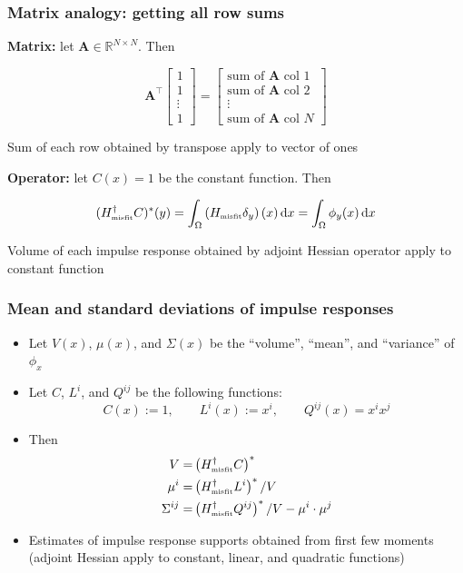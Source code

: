 \documentclass[10pt,final,xcolor=dvipsnames,aspect ratio=169]{beamer}
\begin{document}
\begin{frame}
	\frametitle{Matrix analogy: getting all row sums}
	
	\textbf{Matrix:} let $\mathbf{A} \in \mathbb{R}^{N \times N}$. Then
	
	$$\mathbf{A}^{\top} \begin{bmatrix}
	1 \\ 1 \\ \vdots \\ 1
	\end{bmatrix} = \begin{bmatrix}
	\text{sum of }\mathbf{A} \text{ col }1 \\
	\text{sum of }\mathbf{A} \text{ col }2 \\
	\vdots \\
	\text{sum of }\mathbf{A} \text{ col }N
	\end{bmatrix}$$
	
	Sum of each row obtained by transpose apply to vector of ones
	
	\vspace{3em}
	
	\textbf{Operator:} let $C(x)=1$ be the constant function. Then 
	
	$$(H_{\text{\tiny misfit}}^{\dagger} C)^*(y) = \int_\Omega \left(H_{\text{\tiny misfit}} \delta_y\right)(x) \,\mathrm{d}x=\int_{\Omega}\phi_{y}(x)\,\mathrm{d}x$$
	
	
	Volume of each impulse response obtained by adjoint Hessian operator apply to constant function
\end{frame}
\begin{frame}
	\frametitle{Mean and standard deviations of impulse responses}
	\begin{itemize}
		\setlength\itemsep{2em}
		\item Let $V(x)$, $\mu(x)$, and $\Sigma(x)$ be the ``volume'', ``mean'', and ``variance'' of $\phi_x$
		\item Let $C$, $L^i$, and $Q^{ij}$ be the following functions:
		\begin{equation*}
		C(x) := 1, \qquad
		L^i(x) := x^i, \qquad
		Q^{ij}(x) = x^i x^j
		\end{equation*}
		\item Then
		\begin{align*}
		V =& \left(H_{\text{\tiny misfit}}^{\dagger} C\right)^* \\
		\mu^i =& \left(H_{\text{\tiny misfit}}^{\dagger} L^i\right)^* / V \\
		\Sigma^{ij} =& \left(H_{\text{\tiny misfit}}^{\dagger} Q^{ij}\right)^* / V - \mu^i\cdot \mu^j
		\end{align*}
		\item Estimates of impulse response supports obtained from 
		first few moments (adjoint Hessian apply to constant, linear, and quadratic functions)
	\end{itemize}
	
\end{frame}
\end{document}

